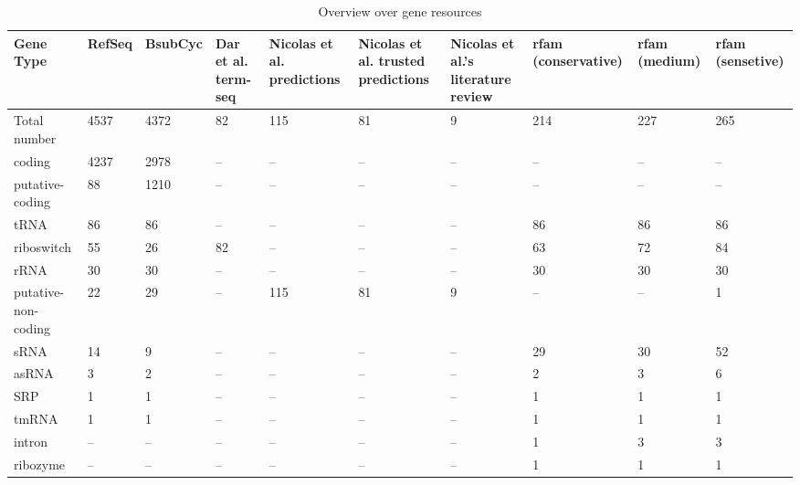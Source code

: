 \begin{table}[t]

\caption{\label{tab:}Overview over gene resources}
\centering
\begin{tabular}{llllllllll}
\toprule
Gene Type & RefSeq & BsubCyc & Dar et al. term-seq & Nicolas et al. predictions & Nicolas et al. trusted predictions & Nicolas et al.'s literature review & rfam (conservative) & rfam (medium) & rfam (sensetive)\\
\midrule
Total number & 4537 & 4372 & 82 & 115 & 81 & 9 & 214 & 227 & 265\\
coding & 4237 & 2978 & -- & -- & -- & -- & -- & -- & --\\
putative-coding & 88 & 1210 & -- & -- & -- & -- & -- & -- & --\\
tRNA & 86 & 86 & -- & -- & -- & -- & 86 & 86 & 86\\
riboswitch & 55 & 26 & 82 & -- & -- & -- & 63 & 72 & 84\\
\addlinespace
rRNA & 30 & 30 & -- & -- & -- & -- & 30 & 30 & 30\\
putative-non-coding & 22 & 29 & -- & 115 & 81 & 9 & -- & -- & 1\\
sRNA & 14 & 9 & -- & -- & -- & -- & 29 & 30 & 52\\
asRNA & 3 & 2 & -- & -- & -- & -- & 2 & 3 & 6\\
SRP & 1 & 1 & -- & -- & -- & -- & 1 & 1 & 1\\
\addlinespace
tmRNA & 1 & 1 & -- & -- & -- & -- & 1 & 1 & 1\\
intron & -- & -- & -- & -- & -- & -- & 1 & 3 & 3\\
ribozyme & -- & -- & -- & -- & -- & -- & 1 & 1 & 1\\
\bottomrule
\end{tabular}
\end{table}
